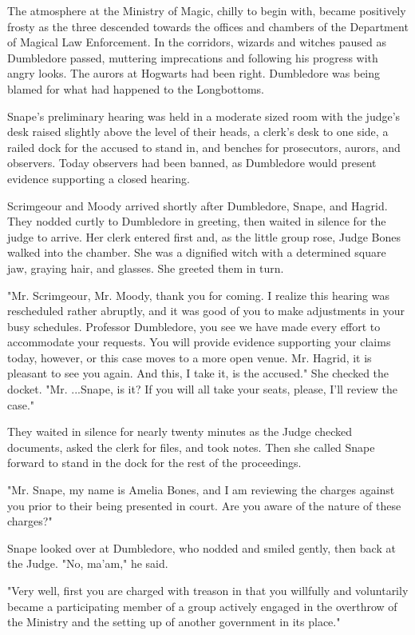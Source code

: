 \documentclass[a4paper,11pt]{article}
\begin{document}
The atmosphere at the Ministry of Magic, chilly to begin with, became positively frosty as the three descended towards the offices and chambers of the Department of Magical Law Enforcement. In the corridors, wizards and witches paused as Dumbledore passed, muttering imprecations and following his progress with angry looks. The aurors at Hogwarts had been right. Dumbledore was being blamed for what had happened to the Longbottoms.

Snape's preliminary hearing was held in a moderate sized room with the judge's desk raised slightly above the level of their heads, a clerk's desk to one side, a railed dock for the accused to stand in, and benches for prosecutors, aurors, and observers. Today observers had been banned, as Dumbledore would present evidence supporting a closed hearing.

Scrimgeour and Moody arrived shortly after Dumbledore, Snape, and Hagrid. They nodded curtly to Dumbledore in greeting, then waited in silence for the judge to arrive. Her clerk entered first and, as the little group rose, Judge Bones walked into the chamber. She was a dignified witch with a determined square jaw, graying hair, and glasses. She greeted them in turn.

"Mr. Scrimgeour, Mr. Moody, thank you for coming. I realize this hearing was rescheduled rather abruptly, and it was good of you to make adjustments in your busy schedules. Professor Dumbledore, you see we have made every effort to accommodate your requests. You will provide evidence supporting your claims today, however, or this case moves to a more open venue. Mr. Hagrid, it is pleasant to see you again. And this, I take it, is the accused." She checked the docket. "Mr. ...Snape, is it? If you will all take your seats, please, I'll review the case."

They waited in silence for nearly twenty minutes as the Judge checked documents, asked the clerk for files, and took notes. Then she called Snape forward to stand in the dock for the rest of the proceedings.

"Mr. Snape, my name is Amelia Bones, and I am reviewing the charges against you prior to their being presented in court. Are you aware of the nature of these charges?"

Snape looked over at Dumbledore, who nodded and smiled gently, then back at the Judge. "No, ma'am," he said.

"Very well, first you are charged with treason in that you willfully and voluntarily became a participating member of a group actively engaged in the overthrow of the Ministry and the setting up of another government in its place."
\end{document}

